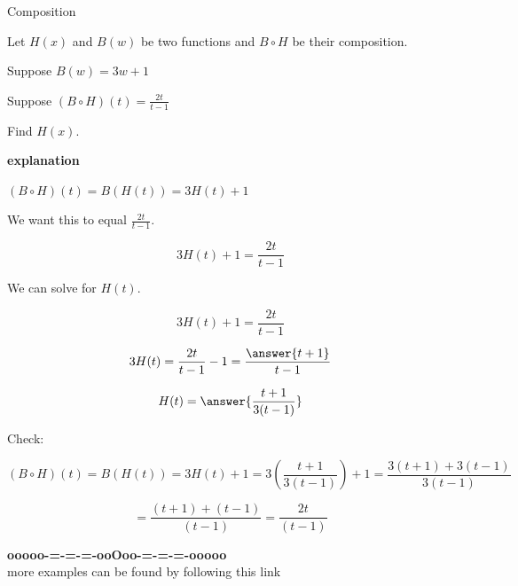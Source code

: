 \documentclass{ximera}
\begin{document}
\begin{example} Composition


Let $H(x)$ and $B(w)$ be two functions and $B \circ H$ be their composition.


Suppose $B(w) = 3w + 1$ 

Suppose $(B \circ H)(t) = \frac{2t}{t-1}$


Find $H(x)$.


\textbf{\textcolor{red!75!green}{explanation}} 




$(B \circ H)(t) =  B(H(t)) = 3 H(t) + 1$ 


We want this to equal $\frac{2t}{t-1}$.




\[
3 H(t) + 1 = \frac{2t}{t-1}
\]


We can solve for $H(t)$.



\[
3 H(t) + 1 = \frac{2t}{t-1}
\]

\[
3 H(t) = \frac{2t}{t-1} - 1 = \frac{\answer{t+1}}{t-1}
\]

\[
H(t)  = \answer{\frac{t+1}{3(t-1)}}
\]



Check:

\[
(B \circ H)(t) =  B(H(t)) = 3 H(t) + 1 = 3 \left( \frac{t+1}{3(t-1)} \right) + 1 = \frac{3(t+1) + 3(t-1)}{3(t-1)} 
\]


\[
 = \frac{(t+1) + (t-1)}{(t-1)}  = \frac{2t}{(t-1)}
\]




\end{example}


























\begin{onlineOnly}
\begin{center}
\textbf{\textcolor{green!50!black}{ooooo-=-=-=-ooOoo-=-=-=-ooooo}} \\

more examples can be found by following this link\\ 

\end{center}
\end{onlineOnly}
\end{document}
